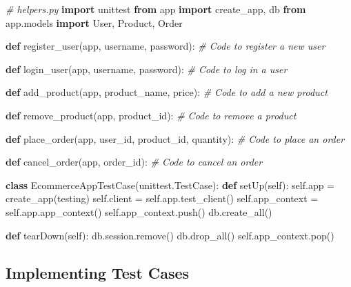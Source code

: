 \documentclass[
  paper=a4,
  ,captions=tableheading
]{scrartcl}
\newenvironment{Shaded}{}{}
\newcommand{\CommentTok}[1]{\textcolor[rgb]{0.38,0.63,0.69}{\textit{#1}}}
\newcommand{\ImportTok}[1]{\textcolor[rgb]{0.00,0.50,0.00}{\textbf{#1}}}
\newcommand{\KeywordTok}[1]{\textcolor[rgb]{0.00,0.44,0.13}{\textbf{#1}}}
\newcommand{\NormalTok}[1]{#1}
\newcommand{\OperatorTok}[1]{\textcolor[rgb]{0.40,0.40,0.40}{#1}}
\newcommand{\StringTok}[1]{\textcolor[rgb]{0.25,0.44,0.63}{#1}}
\newcommand{\VariableTok}[1]{\textcolor[rgb]{0.10,0.09,0.49}{#1}}
\begin{document}
\begin{Shaded}
\begin{Highlighting}[]
\CommentTok{\# helpers.py}
\ImportTok{import}\NormalTok{ unittest}
\ImportTok{from}\NormalTok{ app }\ImportTok{import}\NormalTok{ create\_app, db}
\ImportTok{from}\NormalTok{ app.models }\ImportTok{import}\NormalTok{ User, Product, Order}

\KeywordTok{def}\NormalTok{ register\_user(app, username, password):}
    \CommentTok{\# Code to register a new user}

\KeywordTok{def}\NormalTok{ login\_user(app, username, password):}
    \CommentTok{\# Code to log in a user}

\KeywordTok{def}\NormalTok{ add\_product(app, product\_name, price):}
    \CommentTok{\# Code to add a new product}

\KeywordTok{def}\NormalTok{ remove\_product(app, product\_id):}
    \CommentTok{\# Code to remove a product}

\KeywordTok{def}\NormalTok{ place\_order(app, user\_id, product\_id, quantity):}
    \CommentTok{\# Code to place an order}

\KeywordTok{def}\NormalTok{ cancel\_order(app, order\_id):}
    \CommentTok{\# Code to cancel an order}

\KeywordTok{class}\NormalTok{ EcommerceAppTestCase(unittest.TestCase):}
    \KeywordTok{def}\NormalTok{ setUp(}\VariableTok{self}\NormalTok{):}
        \VariableTok{self}\NormalTok{.app }\OperatorTok{=}\NormalTok{ create\_app(}\StringTok{\textquotesingle{}testing\textquotesingle{}}\NormalTok{)}
        \VariableTok{self}\NormalTok{.client }\OperatorTok{=} \VariableTok{self}\NormalTok{.app.test\_client()}
        \VariableTok{self}\NormalTok{.app\_context }\OperatorTok{=} \VariableTok{self}\NormalTok{.app.app\_context()}
        \VariableTok{self}\NormalTok{.app\_context.push()}
\NormalTok{        db.create\_all()}

    \KeywordTok{def}\NormalTok{ tearDown(}\VariableTok{self}\NormalTok{):}
\NormalTok{        db.session.remove()}
\NormalTok{        db.drop\_all()}
        \VariableTok{self}\NormalTok{.app\_context.pop()}
\end{Highlighting}
\end{Shaded}

\hypertarget{implementing-test-cases}{%
\subsection{Implementing Test Cases}\label{implementing-test-cases}}
\end{document}
